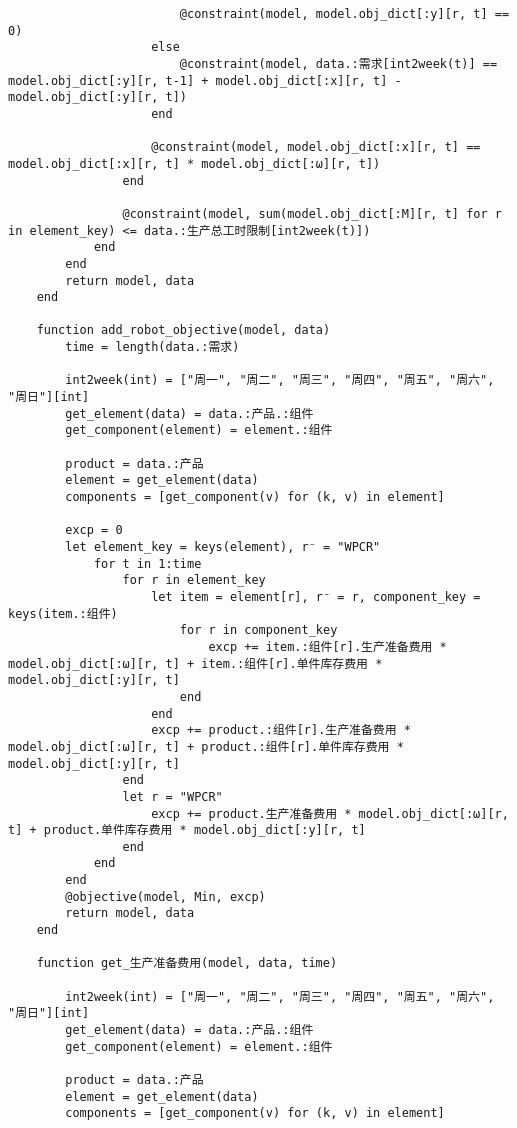 \begin{appendices}
\begin{lstlisting}
                        @constraint(model, model.obj_dict[:y][r, t] == 0)
                    else
                        @constraint(model, data.:需求[int2week(t)] == model.obj_dict[:y][r, t-1] + model.obj_dict[:x][r, t] - model.obj_dict[:y][r, t])
                    end

                    @constraint(model, model.obj_dict[:x][r, t] == model.obj_dict[:x][r, t] * model.obj_dict[:ω][r, t])
                end

                @constraint(model, sum(model.obj_dict[:M][r, t] for r in element_key) <= data.:生产总工时限制[int2week(t)])
            end
        end
        return model, data
    end

    function add_robot_objective(model, data)
        time = length(data.:需求)

        int2week(int) = ["周一", "周二", "周三", "周四", "周五", "周六", "周日"][int]
        get_element(data) = data.:产品.:组件
        get_component(element) = element.:组件

        product = data.:产品
        element = get_element(data)
        components = [get_component(v) for (k, v) in element]

        excp = 0
        let element_key = keys(element), r⁻ = "WPCR"
            for t in 1:time
                for r in element_key
                    let item = element[r], r⁻ = r, component_key = keys(item.:组件)
                        for r in component_key
                            excp += item.:组件[r].生产准备费用 * model.obj_dict[:ω][r, t] + item.:组件[r].单件库存费用 * model.obj_dict[:y][r, t]
                        end
                    end
                    excp += product.:组件[r].生产准备费用 * model.obj_dict[:ω][r, t] + product.:组件[r].单件库存费用 * model.obj_dict[:y][r, t]
                end
                let r = "WPCR"
                    excp += product.生产准备费用 * model.obj_dict[:ω][r, t] + product.单件库存费用 * model.obj_dict[:y][r, t]
                end
            end
        end
        @objective(model, Min, excp)
        return model, data
    end

    function get_生产准备费用(model, data, time)

        int2week(int) = ["周一", "周二", "周三", "周四", "周五", "周六", "周日"][int]
        get_element(data) = data.:产品.:组件
        get_component(element) = element.:组件

        product = data.:产品
        element = get_element(data)
        components = [get_component(v) for (k, v) in element]


\end{lstlisting}
\end{appendices}
